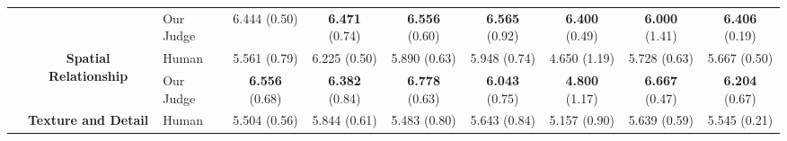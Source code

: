 \documentclass{article}
\begin{document}
\begin{center}
{\begin{tabular}{@{}c c l c c c c c c c@{}}
 & & Our Judge & 6.444 {\fontsize{7.2pt}{8.6pt}\selectfont\textcolor{stdgray}{(0.50)}} & \cellcolor{greendark}\textbf{6.471} {\fontsize{7.2pt}{8.6pt}\selectfont\textcolor{stdgray}{(0.74)}} & \cellcolor{greenlight}\textbf{6.556} {\fontsize{7.2pt}{8.6pt}\selectfont\textcolor{stdgray}{(0.60)}} & \cellcolor{greenlight}\textbf{6.565} {\fontsize{7.2pt}{8.6pt}\selectfont\textcolor{stdgray}{(0.92)}} & \cellcolor{greenlight}\textbf{6.400} {\fontsize{7.2pt}{8.6pt}\selectfont\textcolor{stdgray}{(0.49)}} & \cellcolor{greendark}\textbf{6.000} {\fontsize{7.2pt}{8.6pt}\selectfont\textcolor{stdgray}{(1.41)}} & \cellcolor{greenlight}\textbf{6.406} {\fontsize{7.2pt}{8.6pt}\selectfont\textcolor{stdgray}{(0.19)}} \\
\cmidrule{2-10}
 & \multirow{2}{*}{\textcolor{grpQuality}{\textbf{Spatial Relationship}}} & Human & 5.561 {\fontsize{7.2pt}{8.6pt}\selectfont\textcolor{stdgray}{(0.79)}} & 6.225 {\fontsize{7.2pt}{8.6pt}\selectfont\textcolor{stdgray}{(0.50)}} & 5.890 {\fontsize{7.2pt}{8.6pt}\selectfont\textcolor{stdgray}{(0.63)}} & 5.948 {\fontsize{7.2pt}{8.6pt}\selectfont\textcolor{stdgray}{(0.74)}} & 4.650 {\fontsize{7.2pt}{8.6pt}\selectfont\textcolor{stdgray}{(1.19)}} & 5.728 {\fontsize{7.2pt}{8.6pt}\selectfont\textcolor{stdgray}{(0.63)}} & 5.667 {\fontsize{7.2pt}{8.6pt}\selectfont\textcolor{stdgray}{(0.50)}} \\
 & & Our Judge & \cellcolor{greenlight}\textbf{6.556} {\fontsize{7.2pt}{8.6pt}\selectfont\textcolor{stdgray}{(0.68)}} & \cellcolor{greendark}\textbf{6.382} {\fontsize{7.2pt}{8.6pt}\selectfont\textcolor{stdgray}{(0.84)}} & \cellcolor{greenlight}\textbf{6.778} {\fontsize{7.2pt}{8.6pt}\selectfont\textcolor{stdgray}{(0.63)}} & \cellcolor{greendark}\textbf{6.043} {\fontsize{7.2pt}{8.6pt}\selectfont\textcolor{stdgray}{(0.75)}} & \cellcolor{greendark}\textbf{4.800} {\fontsize{7.2pt}{8.6pt}\selectfont\textcolor{stdgray}{(1.17)}} & \cellcolor{greenlight}\textbf{6.667} {\fontsize{7.2pt}{8.6pt}\selectfont\textcolor{stdgray}{(0.47)}} & \cellcolor{greenlight}\textbf{6.204} {\fontsize{7.2pt}{8.6pt}\selectfont\textcolor{stdgray}{(0.67)}} \\
\cmidrule{2-10}
 & \multirow{2}{*}{\textcolor{grpQuality}{\textbf{Texture and Detail}}} & Human & 5.504 {\fontsize{7.2pt}{8.6pt}\selectfont\textcolor{stdgray}{(0.56)}} & 5.844 {\fontsize{7.2pt}{8.6pt}\selectfont\textcolor{stdgray}{(0.61)}} & 5.483 {\fontsize{7.2pt}{8.6pt}\selectfont\textcolor{stdgray}{(0.80)}} & 5.643 {\fontsize{7.2pt}{8.6pt}\selectfont\textcolor{stdgray}{(0.84)}} & 5.157 {\fontsize{7.2pt}{8.6pt}\selectfont\textcolor{stdgray}{(0.90)}} & 5.639 {\fontsize{7.2pt}{8.6pt}\selectfont\textcolor{stdgray}{(0.59)}} & 5.545 {\fontsize{7.2pt}{8.6pt}\selectfont\textcolor{stdgray}{(0.21)}} \\

\end{tabular}}
\end{center}
\end{document}
